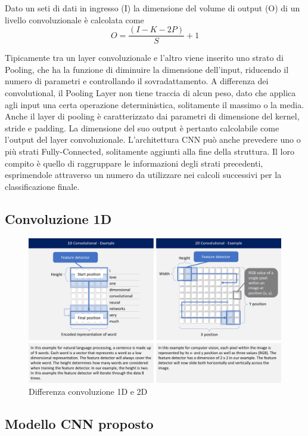 \documentclass{article}
\begin{document}
Dato un seti di dati in ingresso (I) la dimensione del volume di output (O) di un livello convoluzionale è calcolata come
\begin{equation}
O={\frac{(I - K - 2P)}{S} +1}
\end{equation}

Tipicamente tra un layer convoluzionale e l'altro viene inserito uno strato di Pooling, che ha la funzione di diminuire la dimensione dell'input, riducendo il numero di parametri e controllando il sovradattamento. A differenza dei convolutional, il Pooling Layer non tiene traccia di alcun peso, dato che applica agli input una certa operazione deterministica, solitamente il massimo o la media.
Anche il layer di pooling è caratterizzato dai parametri di dimensione del kernel, stride e padding. La dimensione del suo output è pertanto calcolabile come l'output del layer convoluzionale.
L'architettura CNN può anche prevedere uno o più strati Fully-Connected, solitamente aggiunti alla fine della struttura. Il loro compito è quello di raggruppare le informazioni degli strati precedenti, esprimendole attraverso un numero da utilizzare nei calcoli successivi per la classificazione finale. 

\subsection{Convoluzione 1D}
\begin{figure}[!h]
\centering
\includegraphics[scale=0.2]{conv1d}
\caption{Differenza convoluzione 1D e 2D}
\end{figure}

\subsection{Modello CNN proposto}
\end{document}

